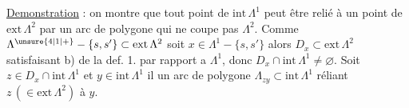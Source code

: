 \uline{Demonstration} : on montre que tout point de $\mathrm{int}\,\Lambda^{1}$ peut être relié à un point de $\mathrm{ext}\,\Lambda^{2}$ par un arc de polygone qui ne coupe pas $\Lambda^{2}$. Comme $\Lambda^{\unsure{4|1|+}}-\{s,s'\}\subset\mathrm{ext}\,\Lambda^{2}$ soit $x\in\Lambda^{1}-\{s,s'\}$ alors  $D_x\subset\mathrm{ext}\,\Lambda^{2}$ satisfaisant b) de la def. 1. par rapport a $\Lambda^{1}$, donc $D_x\cap\mathrm{int}\,\Lambda^{1}\ne\varnothing$. Soit $z\in D_x\cap\mathrm{int}\,\Lambda^{1}$ et $y\in\mathrm{int}\,\Lambda^{1}$ il  un arc de polygone $\Lambda_{zy}\subset\mathrm{int}\,\Lambda^{1}$ réliant $z\,(\in\mathrm{ext}\,\Lambda^{2})$ à $y$.
